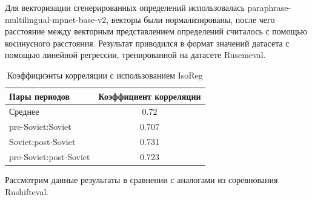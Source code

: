 \documentclass[LI,VKR]{HSEUniversity}
\begin{document}
Для векторизации сгенерированных определений использовалась paraphrase-multilingual-mpnet-base-v2,
векторы были нормализированы, после чего расстояние между
векторным представлением определений считалось с помощью косинусного расстояния.
Результат приводился в формат значений датасета с помощью линейной регрессии,
тренированной на датасете Rusemeval.

\begin{table}[H]
\centering
\caption{Коэффициэнты корреляции с использованием IsoReg}
\begin{tabular}{lc}
\hline
Пары периодов                  & Коэффициент корреляции \\
\hline
Среднее            & 0.72                  \\
pre-Soviet:Soviet           & 0.707                  \\
Soviet:post-Soviet          & 0.731                  \\
pre-Soviet:post-Soviet      & 0.723                  \\
\hline
\end{tabular}
\end{table}

Рассмотрим данные результаты в сравнении с аналогами из соревнования Rushifteval.
\end{document}

